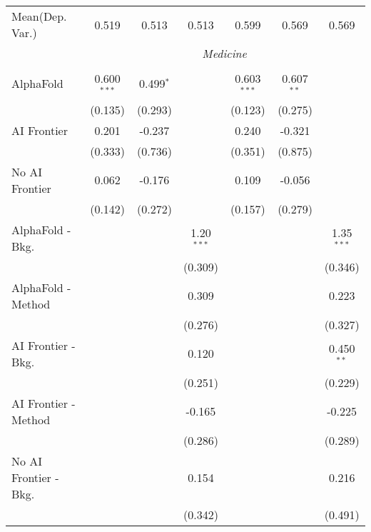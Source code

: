 \begin{tabular}{lcccccc}
Mean(Dep. Var.) & 0.519 & 0.513 & 0.513 & 0.599 & 0.569 & 0.569 \\
 & \multicolumn{6}{c}{\textit{Medicine}} \\ \\
   AlphaFold               & 0.600$^{***}$ & 0.499$^{*}$ &              & 0.603$^{***}$ & 0.607$^{**}$ &   \\   
                           & (0.135)       & (0.293)     &              & (0.123)       & (0.275)      &   \\   
   AI Frontier             & 0.201         & -0.237      &              & 0.240         & -0.321       &   \\   
                           & (0.333)       & (0.736)     &              & (0.351)       & (0.875)      &   \\   
   No AI Frontier          & 0.062         & -0.176      &              & 0.109         & -0.056       &   \\   
                           & (0.142)       & (0.272)     &              & (0.157)       & (0.279)      &   \\   
   AlphaFold - Bkg.        &               &             & 1.20$^{***}$ &               &              & 1.35$^{***}$\\   
                           &               &             & (0.309)      &               &              & (0.346)\\   
   AlphaFold - Method      &               &             & 0.309        &               &              & 0.223\\   
                           &               &             & (0.276)      &               &              & (0.327)\\   
   AI Frontier - Bkg.      &               &             & 0.120        &               &              & 0.450$^{**}$\\   
                           &               &             & (0.251)      &               &              & (0.229)\\   
   AI Frontier - Method    &               &             & -0.165       &               &              & -0.225\\   
                           &               &             & (0.286)      &               &              & (0.289)\\   
   No AI Frontier - Bkg.   &               &             & 0.154        &               &              & 0.216\\   
                           &               &             & (0.342)      &               &              & (0.491)\\   

\end{tabular}
